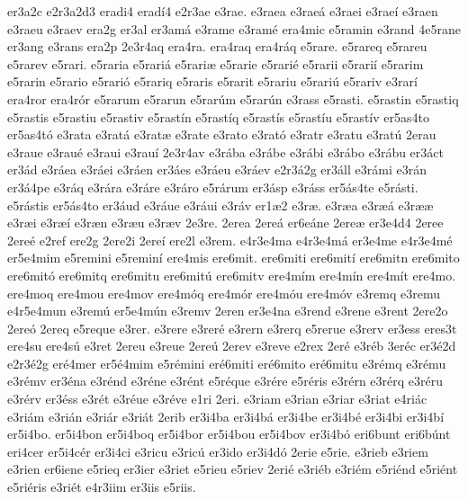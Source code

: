 {er3a2c
e2r3a2d3
eradi4
erad^^ed4
e2r3ae
e3rae.
e3raea
e3rae^^e1
e3raei
e3rae^^ed
e3raen
e3raeu
e3raev
era2g
er3al
er3am^^e1
e3rame
e3ram^^e9
era4mic
e5ramin
e3rand
4e5rane
er3ang
e3rans
era2p
2e3r4aq
era4ra.
era4raq
era4r^^e1q
e5rare.
e5rareq
e5rareu
e5rarev
e5rari.
e5raria
e5rari^^e1
e5rari^^e6
e5rarie
e5rari^^e9
e5rarii
e5rari^^ed
e5rarim
e5rarin
e5rario
e5rari^^f3
e5rariq
e5raris
e5rarit
e5rariu
e5rari^^fa
e5rariv
e3rar^^ed
era4ror
era4r^^f3r
e5rarum
e5rarun
e5rar^^fam
e5rar^^fan
e3rass
e5rasti.
e5rastin
e5rastiq
e5rastis
e5rastiu
e5rastiv
e5rast^^edn
e5rast^^edq
e5rast^^eds
e5rast^^edu
e5rast^^edv
er5as4to
er5as4t^^f3
e3rata
e3rat^^e1
e3rat^^e6
e3rate
e3rato
e3rat^^f3
e3ratr
e3ratu
e3rat^^fa
2erau
e3raue
e3rau^^e9
e3raui
e3rau^^ed
2e3r4av
e3r^^e1ba
e3r^^e1be
e3r^^e1bi
e3r^^e1bo
e3r^^e1bu
er3^^e1ct
er3^^e1d
e3r^^e1ea
e3r^^e1ei
e3r^^e1en
er3^^e1es
e3r^^e1eu
e3r^^e1ev
e2r3^^e12g
er3^^e1ll
e3r^^e1mi
e3r^^e1n
er3^^e14pe
e3r^^e1q
e3r^^e1ra
e3r^^e1re
e3r^^e1ro
e5r^^e1rum
er3^^e1sp
e3r^^e1ss
er5^^e1s4te
e5r^^e1sti.
e5r^^e1stis
er5^^e1s4to
er3^^e1ud
e3r^^e1ue
e3r^^e1ui
e3r^^e1v
er1^^e62
e3r^^e6.
e3r^^e6a
e3r^^e6^^e1
e3r^^e6^^e6
e3r^^e6i
e3r^^e6^^ed
e3r^^e6n
e3r^^e6u
e3r^^e6v
2e3re.
2erea
2ere^^e1
er6e^^e1ne
2ere^^e6
er3e4d4
2eree
2ere^^e9
e2ref
ere2g
2ere2i
2ere^^ed
ere2l
e3rem.
e4r3e4ma
e4r3e4m^^e1
er3e4me
e4r3e4m^^e9
er5e4mim
e5remini
e5remin^^ed
ere4mis
ere6mit.
ere6miti
ere6mit^^ed
ere6mitn
ere6mito
ere6mit^^f3
ere6mitq
ere6mitu
ere6mit^^fa
ere6mitv
ere4m^^edm
ere4m^^edn
ere4m^^edt
ere4mo.
ere4moq
ere4mou
ere4mov
ere4m^^f3q
ere4m^^f3r
ere4m^^f3u
ere4m^^f3v
e3remq
e3remu
e4r5e4mun
e3rem^^fa
er5e4m^^fan
e3remv
2eren
er3e4na
e3rend
e3rene
e3rent
2ere2o
2ere^^f3
2ereq
e5reque
e3rer.
e3rere
e3rer^^e9
e3rern
e3rerq
e5rerue
e3rerv
er3ess
eres3t
ere4su
ere4s^^fa
e3ret
2ereu
e3reue
2ere^^fa
2erev
e3reve
e2rex
2er^^e9
e3r^^e9b
3er^^e9c
er3^^e92d
e2r3^^e92g
er^^e94mer
er5^^e94mim
e5r^^e9mini
er^^e96miti
er^^e96mito
er^^e96mitu
e3r^^e9mq
e3r^^e9mu
e3r^^e9mv
er3^^e9na
e3r^^e9nd
e3r^^e9ne
e3r^^e9nt
e5r^^e9que
e3r^^e9re
e5r^^e9ris
e3r^^e9rn
e3r^^e9rq
e3r^^e9ru
e3r^^e9rv
er3^^e9ss
e3r^^e9t
e3r^^e9ue
e3r^^e9ve
e1ri
2eri.
e3riam
e3rian
e3riar
e3riat
e4ri^^e1c
e3ri^^e1m
e3ri^^e1n
e3ri^^e1r
e3ri^^e1t
2erib
er3i4ba
er3i4b^^e1
er3i4be
er3i4b^^e9
er3i4bi
er3i4b^^ed
er5i4bo.
er5i4bon
er5i4boq
er5i4bor
er5i4bou
er5i4bov
er3i4b^^f3
eri6bunt
eri6b^^fant
eri4cer
er5i4c^^e9r
er3i4ci
e3ricu
e3ric^^fa
er3ido
er3i4d^^f3
2erie
e5rie.
e3rieb
e3riem
e3rien
er6iene
e5rieq
er3ier
e3riet
e5rieu
e5riev
2eri^^e9
e3ri^^e9b
e3ri^^e9m
e5ri^^e9nd
e5ri^^e9nt
e5ri^^e9ris
e3ri^^e9t
e4r3iim
er3iis
e5riis.
}
